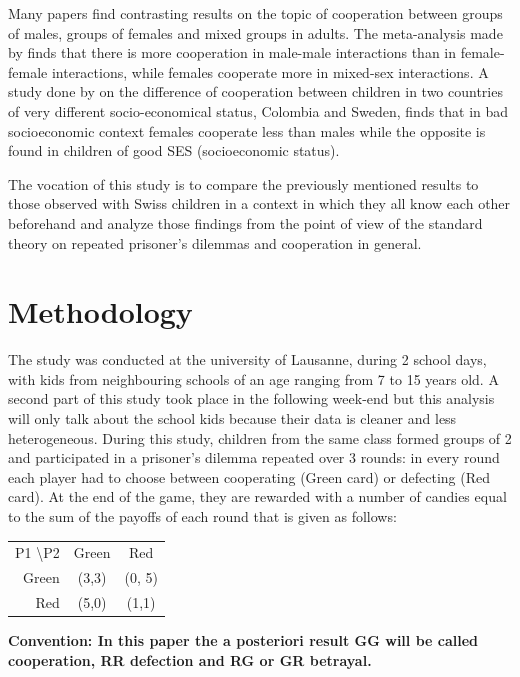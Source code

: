 \documentclass{article} %
\begin{document}
Many papers find contrasting results on the topic of cooperation between groups of males, groups of females and mixed groups in adults. The meta-analysis made by \cite{balliet} finds that there is more cooperation in male-male interactions than in female-female interactions, while females cooperate more in mixed-sex interactions. A study done by \cite{card} on the difference of cooperation between children in two countries of very different socio-economical status, Colombia and Sweden, finds that in bad socioeconomic context females cooperate less than males while the opposite is found in children of good SES (socioeconomic status).

The vocation of this study is to compare the previously mentioned results to those observed with Swiss children in a context in which they all know each other beforehand and analyze those findings from the point of view of the standard theory on repeated prisoner's dilemmas and cooperation in general.


\section{Methodology}
The study was conducted at the university of Lausanne, during 2 school days, with kids from neighbouring schools of an age ranging from 7 to 15 years old. A second part of this study took place in the following week-end but this analysis will only talk about the school kids because their data is cleaner and less heterogeneous.
During this study, children from the same class formed groups of 2 and participated in a prisoner's dilemma repeated over 3 rounds: in every round each player had to choose between cooperating (Green card) or defecting (Red card). At the end of the game, they are rewarded with a number of candies equal to the sum of the payoffs of each round that is given as follows: 
\begin{table}[H]
\centering

\begin{tabular}{ r|c|c| }
\multicolumn{1}{r}{P1 \textbackslash P2}
 &  \multicolumn{1}{c}{Green}
 & \multicolumn{1}{c}{Red} \\
\cline{2-3}
Green & (3,3) & (0, 5) \\
\cline{2-3}
Red & (5,0) & (1,1) \\
\cline{2-3}
\end{tabular}

\end{table}

\textbf{Convention: In this paper the a posteriori result GG will be called cooperation, RR defection and RG or GR betrayal.}
\end{document}
